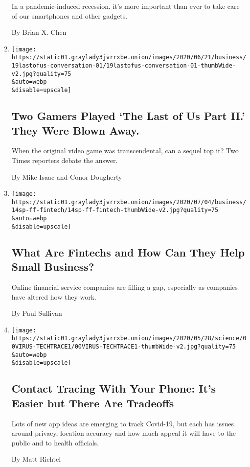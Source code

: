 \begin{enumerate}
  In a pandemic-induced recession, it's more important than ever to take
  care of our smartphones and other gadgets.

  By Brian X. Chen
\item
  \href{/2020/06/19/technology/last-of-us-2-gameplay.html}{}

  \texttt{[image: https://static01.graylady3jvrrxbe.onion/images/2020/06/21/business/19lastofus-conversation-01/19lastofus-conversation-01-thumbWide-v2.jpg?quality=75\\\&auto=webp\\\&disable=upscale]}

  \hypertarget{two-gamers-played-the-last-of-us-part-ii-they-were-blown-away}{%
  \subsection{Two Gamers Played `The Last of Us Part II.' They Were
  Blown
  Away.}\label{two-gamers-played-the-last-of-us-part-ii-they-were-blown-away}}

  When the original video game was transcendental, can a sequel top it?
  Two Times reporters debate the answer.

  By Mike Isaac and Conor Dougherty
\item
  \href{/2020/06/10/business/economy/fintechs-loan-small-business.html}{}

  \texttt{[image: https://static01.graylady3jvrrxbe.onion/images/2020/07/04/business/14sp-ff-fintech/14sp-ff-fintech-thumbWide-v2.jpg?quality=75\\\&auto=webp\\\&disable=upscale]}

  \hypertarget{what-are-fintechs-and-how-can-they-help-small-business}{%
  \subsection{What Are Fintechs and How Can They Help Small
  Business?}\label{what-are-fintechs-and-how-can-they-help-small-business}}

  Online financial service companies are filling a gap, especially as
  companies have altered how they work.

  By Paul Sullivan
\item
  \href{/2020/06/03/health/coronavirus-contact-tracing-apps.html}{}

  \texttt{[image: https://static01.graylady3jvrrxbe.onion/images/2020/05/28/science/00VIRUS-TECHTRACE1/00VIRUS-TECHTRACE1-thumbWide-v2.jpg?quality=75\\\&auto=webp\\\&disable=upscale]}

  \hypertarget{contact-tracing-with-your-phone-its-easier-but-there-are-tradeoffs}{%
  \subsection{Contact Tracing With Your Phone: It's Easier but There Are
  Tradeoffs}\label{contact-tracing-with-your-phone-its-easier-but-there-are-tradeoffs}}

  Lots of new app ideas are emerging to track Covid-19, but each has
  issues around privacy, location accuracy and how much appeal it will
  have to the public and to health officials.

  By Matt Richtel
\end{enumerate}

